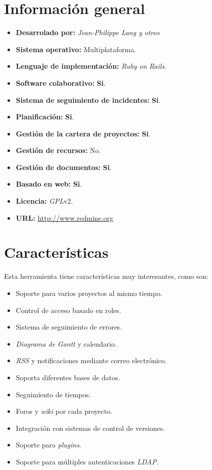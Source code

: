 \documentclass[11pt,a4paper,spanish,twoside]{report}
\begin{document}
\section{Información general}
	\begin{itemize}
		\item \textbf{Desarrolado por:} \emph{Jean-Philippe Lang y otros}
		\item \textbf{Sistema operativo:} Multiplataforma.
		\item \textbf{Lenguaje de implementación:} \emph{Ruby on Rails}.
    \item \textbf{Software colaborativo:} \textbf{Si}.
    \item \textbf{Sistema de seguimiento de incidentes:} \textbf{Si}.
		\item \textbf{Planificación:} \textbf{Si}.
		\item \textbf{Gestión de la cartera de proyectos:} \textbf{Si}.
		\item \textbf{Gestión de recursos:} No.
		\item \textbf{Gestión de documentos:} \textbf{Si}.
		\item \textbf{Basado en web:} \textbf{Si}.
		\item \textbf{Licencia:} \emph{GPL}v2.
		\item \textbf{URL:} \url{http://www.redmine.org}
	\end{itemize}
\section{Características}

Esta herramienta tiene características muy interesantes, como son:

\begin{itemize}
  \item Soporte para varios proyectos al mismo tiempo.
  \item Control de acceso basado en roles.
  \item Sistema de seguimiento de errores.
  \item \emph{Diagrama de Gantt} y calendario.
  \item \emph{RSS} y notificaciones mediante correo electrónico.
  \item Soporta diferentes bases de datos.
  \item Seguimiento de tiempos.
  \item Foros y \emph{wiki} por cada proyecto.
  \item Integración con sistemas de control de versiones.
  \item Soporte para \emph{plugins}.
  \item Soporte para múltiples autenticaciones \emph{LDAP}.
\end{itemize}
\end{document}
